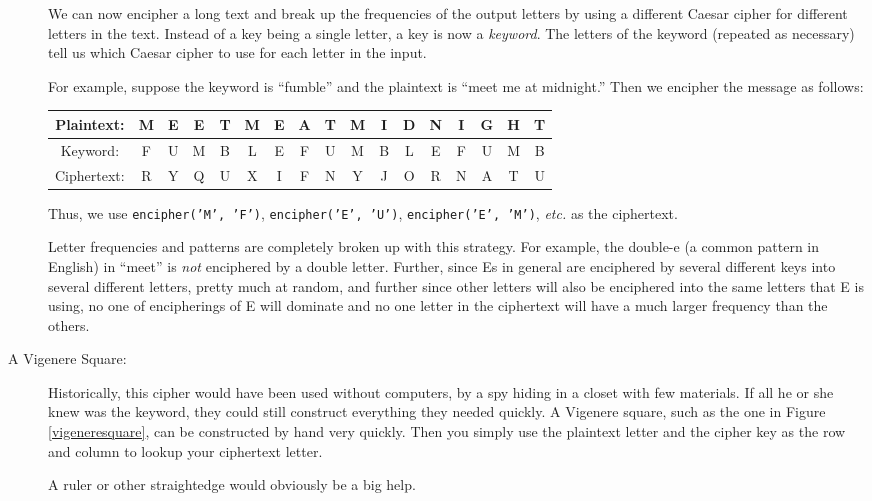 \documentclass{article}
\begin{document}
\begin{description}
We can now encipher a long text and break up the frequencies of the
output letters by using a different Caesar cipher for different
letters in the text.  Instead of a key being a single letter, a key is
now a {\em keyword}.  The letters of the keyword (repeated as
necessary) tell us which Caesar cipher to use for each letter in the
input.

For example, suppose the keyword is ``fumble'' and the plaintext is
``meet me at midnight.''  Then we encipher the message as
follows:

\begin{tabular}{|c|c|c|c|c|c|c|c|c|c|c|c|c|c|c|c|c|}
    \hline
  Plaintext: &  M&E&E&T&M&E&A&T&M&I&D&N&I&G&H&T  \\\hline
  Keyword: &    F&U&M&B&L&E&F&U&M&B&L&E&F&U&M&B  \\\hline
  Ciphertext: & R&Y&Q&U&X&I&F&N&Y&J&O&R&N&A&T&U  \\\hline
\end{tabular}

Thus, we use {\tt encipher('M', 'F')}, {\tt encipher('E', 'U')},
{\tt encipher('E', 'M')}, {\em etc.} as the ciphertext.

Letter frequencies and patterns are completely broken up with this
strategy.  For example, the double-e (a common pattern in English) in
``meet'' is {\em not} enciphered by a double letter.  Further, since
Es in general are enciphered by several different keys into several
different letters, pretty much at random, and further since other
letters will also be enciphered into the same letters that E is using,
no one of encipherings of E will dominate and no one letter in the
ciphertext will have a much larger frequency than the others.

\item[A Vigenere Square:]  Historically, this cipher would have been
  used without computers, by a spy hiding in a closet with few
  materials. If all he or she knew was the keyword, they could still
  construct everything they needed quickly.  A Vigenere square, such
  as the one in Figure \ref{vigeneresquare}, can be constructed by
  hand very quickly.  Then you simply use the plaintext letter and the
  cipher key as the row and column to lookup your ciphertext letter. 

A ruler or other straightedge would obviously be a big help.

  \begin{figure}


\end{figure}
\end{description}
\end{document}
